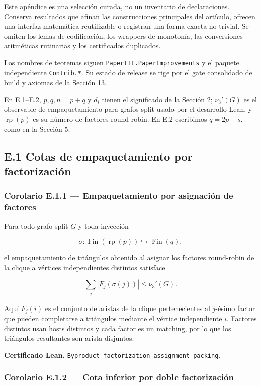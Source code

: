 \documentclass[
  spanish,
  11pt,
  a4paper,
]{article}
\begin{document}
Este apéndice es una selección curada, no un inventario de declaraciones. Conserva resultados que afinan las construcciones principales del artículo, ofrecen una interfaz matemática reutilizable o registran una forma exacta no trivial. Se omiten los lemas de codificación, los wrappers de monotonía, las conversiones aritméticas rutinarias y los certificados duplicados.

Los nombres de teoremas siguen \texttt{PaperIII.PaperImprovements} y el paquete independiente \texttt{Contrib.*}. Su estado de release se rige por el gate consolidado de build y axiomas de la Sección 13.

En E.1--E.2, \(p,q,n=p+q\) y \(d_i\) tienen el significado de la Sección 2; \(\nu_3'(G)\) es el observable de empaquetamiento para grafos split usado por el desarrollo Lean, y \(\operatorname{rp}(p)\) es su número de factores round-robin. En E.2 escribimos \(q=2p-s\), como en la Sección 5.

\subsection{E.1 Cotas de empaquetamiento por factorización}\label{e.1-cotas-de-empaquetamiento-por-factorizaciuxf3n}

\subsubsection{Corolario E.1.1 --- Empaquetamiento por asignación de factores}\label{corolario-e.1.1-empaquetamiento-por-asignaciuxf3n-de-factores}

Para todo grafo split \(G\) y toda inyección

\[\sigma:\operatorname{Fin}(\operatorname{rp}(p))\hookrightarrow \operatorname{Fin}(q),\]

el empaquetamiento de triángulos obtenido al asignar los factores round-robin de la clique a vértices independientes distintos satisface

\[\sum_j |F_j(\sigma(j))|\le \nu_3'(G).\]

Aquí \(F_j(i)\) es el conjunto de aristas de la clique pertenecientes al \(j\)-ésimo factor que pueden completarse a triángulos mediante el vértice independiente \(i\). Factores distintos usan hosts distintos y cada factor es un matching, por lo que los triángulos resultantes son arista-disjuntos.

\textbf{Certificado Lean.} \texttt{Byproduct\_factorization\_assignment\_packing}.

\subsubsection{Corolario E.1.2 --- Cota inferior por doble factorización}\label{corolario-e.1.2-cota-inferior-por-doble-factorizaciuxf3n}
\end{document}
